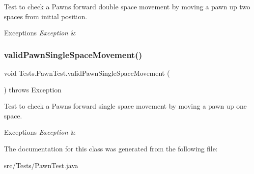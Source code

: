 Test to check a Pawn\textquotesingle{}s forward double space movement by moving a pawn up two spaces from initial position. 
\begin{DoxyExceptions}{Exceptions}
{\em Exception} & \\
\hline
\end{DoxyExceptions}
\hypertarget{class_tests_1_1_pawn_test_afc62c7df60ea48714139aa3b1fdec002}{}\label{class_tests_1_1_pawn_test_afc62c7df60ea48714139aa3b1fdec002} 
\subsubsection{\texorpdfstring{valid\+Pawn\+Single\+Space\+Movement()}{validPawnSingleSpaceMovement()}}
{\footnotesize\ttfamily void Tests.\+Pawn\+Test.\+valid\+Pawn\+Single\+Space\+Movement (\begin{DoxyParamCaption}{ }\end{DoxyParamCaption}) throws Exception}

Test to check a Pawn\textquotesingle{}s forward single space movement by moving a pawn up one space. 
\begin{DoxyExceptions}{Exceptions}
{\em Exception} & \\
\hline
\end{DoxyExceptions}


The documentation for this class was generated from the following file\+:\begin{DoxyCompactItemize}
\item 
src/\+Tests/Pawn\+Test.\+java\end{DoxyCompactItemize}
